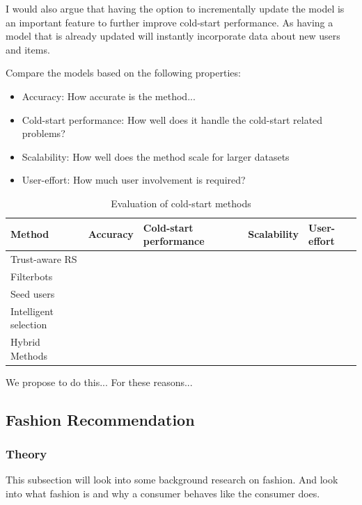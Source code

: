 I would also argue that having the option to incrementally update the model is
an important feature to further improve cold-start performance. As having a
model that is already updated will instantly incorporate data about new users
and items.

Compare the models based on the following properties:

\begin{itemize}
	\item Accuracy: How accurate is the method...
	\item Cold-start performance: How well does it handle the cold-start related problems?
	\item Scalability: How well does the method scale for larger datasets
	\item User-effort: How much user involvement is required?
\end{itemize}

\begin{table}[H]
    \centering
    \begin{tabular}{|l|l|l|l|l|}
    \hline
	Method & Accuracy & Cold-start performance & Scalability & User-effort \\ \hline
	Trust-aware RS & & & \\ \hline
	Filterbots & & & \\ \hline
	Seed users & & & \\ \hline
	Intelligent selection & & & \\ \hline
	Hybrid Methods & & & \\ \hline
    \end{tabular}
    \label{table:evaluationcoldstart}
    \caption [Evaluation of cold-start methods]{Evaluation of cold-start methods}
\end{table}

We propose to do this...
For these reasons...

\subsection{Fashion Recommendation}


\subsubsection{Theory}
This subsection will look into some background research on fashion.
And look into what fashion is and why a consumer behaves like the consumer does.

